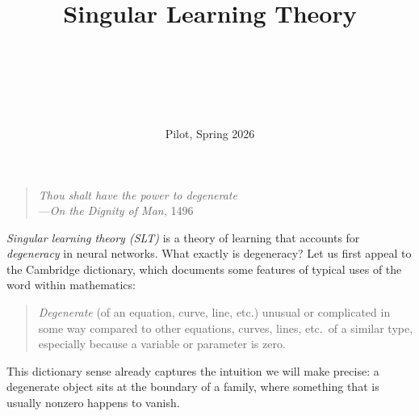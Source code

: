 \documentclass[11pt]{article}
\title{
    Singular Learning Theory
}
\author{
    \authorname{Kai Ogden}\\
    \affiliation{University of Oxford}
    \and
    \authorname{Matthew Farrugia-Roberts}\\
    \affiliation{University of Oxford}
    \and
    \authorname{Zach Furman}\\
    \affiliation{The University of Melbourne}
}
\date{%
    Pilot, Spring 2026
}
\begin{document}

\maketitle

\thispagestyle{copyright}

\bgroup
\renewcommand\section[2]{}
\setlength{\parskip}{0ex}
\tableofcontents
\egroup




\clearpage
\thispagestyle{empty}
\null
\vfill
\begin{quote}
    \centering
    \textit{Thou shalt have the power to degenerate}\\
    \qquad\qquad\qquad---\textit{On the Dignity of Man,} 1496
\end{quote}
\vfill
\vfill


\clearpage

\section*{Introduction}
\label{sec:intro}

\emph{Singular learning theory (SLT)} is a theory of learning that accounts for
\emph{degeneracy} in neural networks. What exactly is degeneracy? Let us first
appeal to the Cambridge dictionary, which documents some features of typical
uses of the word within mathematics:
\begin{quote}
    \emph{Degenerate} (of an equation, curve, line, etc.) unusual or
    complicated in some way compared to other equations, curves, lines, etc.\
    of a similar type, especially because a variable or parameter is zero.
\end{quote}
This dictionary sense already captures the intuition we will make precise:
a degenerate object sits at the boundary of a family, where something that is
usually nonzero happens to vanish.
\end{document}
